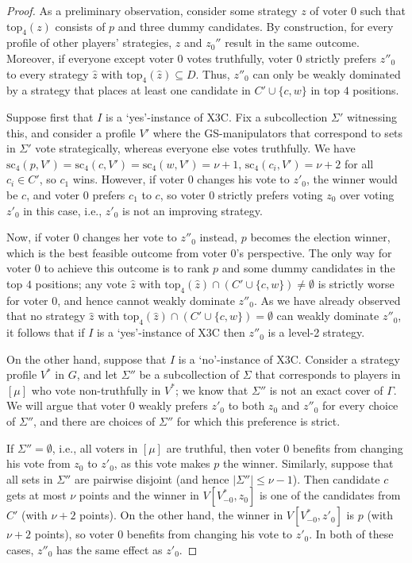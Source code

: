\documentclass[11pt]{article}
\newcommand{\tp}{\mathrm{top}}
\newcommand{\scr}{\mathrm{sc}}
\begin{document}
\begin{proof}
As a preliminary observation, consider some strategy $z$ of voter $0$ such that $\tp_4(z)$ consists of $p$ 
and three dummy candidates. By construction, 
for every profile of other players' strategies, $z$ and $z_0''$ result in the same outcome.
Moreover, if everyone except voter $0$ votes truthfully, voter $0$ strictly prefers $z''_0$
to every strategy $\hat{z}$ with $\tp_4(\hat{z})\subseteq D$. Thus, $z''_0$
can only be weakly dominated by a strategy that places at least one candidate in $C'\cup \{c, w\}$ 
in top $4$ positions.

Suppose first that $I$ is a `yes'-instance of {\sc X3C}. Fix a subcollection $\Sigma'$
witnessing this, and consider a profile $V'$ where the GS-manipulators that correspond to sets in $\Sigma'$ 
vote strategically, whereas everyone else votes truthfully. 
We have $\scr_4(p, V')=\scr_4(c, V')=\scr_4(w, V') = 
\nu+1$, $\scr_4(c_i, V')=\nu+2$ for all $c_i\in C'$, 
so $c_1$ wins. 
However, if voter $0$ changes his vote to $z'_0$, the winner would be $c$, and voter $0$ prefers $c_1$ to $c$,
so voter $0$ strictly prefers voting $z_0$ over voting $z'_0$ in this case, 
i.e., $z'_0$ is not an improving strategy.

Now, if voter $0$ changes her vote to $z''_0$ instead, $p$ becomes the election winner, 
which is the best feasible outcome from voter $0$'s perspective. The only
way for voter $0$ to achieve this outcome is to rank $p$ and some dummy candidates in the top $4$ positions;
any vote $\widehat{z}$ with $\tp_4(\widehat{z})\cap (C'\cup\{c, w\})\neq\emptyset$ is strictly worse for voter $0$,
and hence cannot weakly dominate $z''_0$. As we have already observed that no strategy $\widehat{z}$ 
with $\tp_4(\widehat{z})\cap (C'\cup\{c, w\})=\emptyset$ can weakly dominate $z''_0$,
it follows that if $I$ is a `yes'-instance of X3C then $z''_0$ is a level-2 strategy.

On the other hand, suppose that $I$ is a `no'-instance of X3C.
Consider a strategy profile $V^*$ in $G$, and let 
$\Sigma''$ be a subcollection of $\Sigma$ that corresponds to players in $[\mu]$ 
who vote non-truthfully in $V^*$; we know that $\Sigma''$ is not an exact cover of $\Gamma$.
We will argue that voter $0$ weakly prefers $z'_0$ to both $z_0$ and $z''_0$ for every choice of $\Sigma''$,
and there are choices of $\Sigma''$ for which this preference is strict.

If $\Sigma''=\emptyset$, i.e., all voters in $[\mu]$ are truthful, then voter $0$ benefits
from changing his vote from $z_0$ to $z'_0$, as this vote makes $p$ the winner. 
Similarly, suppose that
all sets in $\Sigma''$ are pairwise disjoint (and hence $|\Sigma''| \le \nu-1$).
Then candidate $c$ gets at most $\nu$ points and
the winner in $V[V^*_{-0}, z_0]$ is one of the candidates from $C'$ (with $\nu+2$ points).
On the other hand, the winner in $V[V^*_{-0}, z'_0]$ 
is $p$ (with $\nu+2$ points), so voter $0$
benefits from changing his vote to $z'_0$.
In both of these cases, $z''_0$ has the same effect as $z'_0$.


\end{proof}
\end{document}
